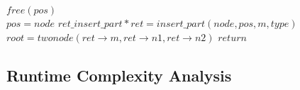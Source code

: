 \documentclass[20pt]{article}
\begin{document}
\begin{algorithm}
     { 
        $free(pos)$ \\
        $pos=node$
    } {
         {
             {
                $ret\_insert\_part* ret=insert\_part(node,pos,m,type)$ \\
                 {
                    $root=twonode(ret \rightarrow m,ret \rightarrow n1,ret \rightarrow n2)$
                }
            }
        }
    }
    $return$
\end{algorithm}
\subsection{Runtime Complexity Analysis}
\end{document}
